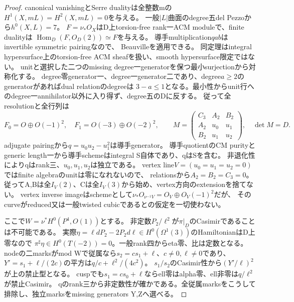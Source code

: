 \documentclass[a4paper,11pt]{ltjsarticle}
\theoremstyle{definition}
\begin{document}
\begin{proof}
canonical vanishingとSerre dualityは全整数mの$H^1(X,mL)=H^2(X,mL)=0$を与える。
一般$|L|$曲面のdegree五del Pezzoから$h^0(X,L)=7$。
$F=\nu_*O_X$はD上torsion-free rank一ACM moduleで、finite dualityは
$\operatorname{Hom}_D(F,O_D(2))\simeq F$を与える。
導手multiplication$qab$はinvertible symmetric pairingなので、
Beauville\cite[Theorem B, pp.44--45]{beauvilleDet}を適用できる。
同定理はintegral hypersurface上のtorsion-free ACM sheafを扱い、smooth hypersurface限定ではない。
unitと選択した二つのmissing degree一generatorを保つ最小surjectionから対称化する。
degree零generator一、degree一generator二であり、degree$a\ge2$のgeneratorがあればdual relationのdegreeは
$3-a\le1$となる。最小性からunit行へのdegree一annihilator以外に入り得ず、degree五のDに反する。
従って全resolutionと全行列は
\[
 F_0=O\oplus O(-1)^2,\quad F_1=O(-3)\oplus O(-2)^2,\qquad
 M=\begin{pmatrix}C_3&A_2&B_2\\A_2&u_0&u_1\\B_2&u_1&u_2\end{pmatrix},
 \quad\det M=D.
\]
adjugate pairingから$q=u_0u_2-u_1^2$は導手generator。
導手quotientのCM purityとgeneric length一から導手schemeはintegral S自体であり、qはSを含む。
非退化性によりqはrank三、$u_0,u_1,u_2$は独立である。
vertex line$V=(u_0=u_1=u_2=0)$ではfinite algebraのunitは零になれないので、
relationsから$A_2=B_2=C_3=0$。
従ってA,Bは全$I_V(2)$、Cは全$I_V(3)$から始め、vertex方向のextensionを捨てない。
vertex inverse imageはschemeとして$\nu_*O_{\nu^{-1}V}=O_V\oplus O_V(-1)^2$だが、
そのcurveがreduced又は一般twisted cubicであるとの仮定を一切使わない。

ここで$W=\nu^*H^0(P^4,O(1))$とする。
非定数$P_2/\ell^2$が$\pi|_D$のCasimirであることは不可能である。
実際$\eta=\ell dP_2-2P_2d\ell\in H^0(\Omega^1(3))$のHamiltonianはD上零なので
$\pi^\sharp\eta\in H^0(T(-2))=0$。一般rank四からeta零、比は定数となる。
nodeの二marksがmod Wで従属なら$s_2=cs_1+\ell$、$c\ne0,\ell\ne0$であり、
$Y'=s_1+\ell/(2c)$の平方は$q/c+\ell^2/(4c^2)$。
$s_1/s_2$のCasimir性から$(Y'/\ell)^2$が上の禁止型となる。
cuspでも$s_1=cs_0+\ell$ならell零はalpha零、ell非零は$q/\ell^2$が禁止Casimir。
qのrank三から非定数性が確かである。全従属marksをこうして排除し、独立marksをmissing generators Y,Zへ選べる。


\end{proof}
\end{document}
